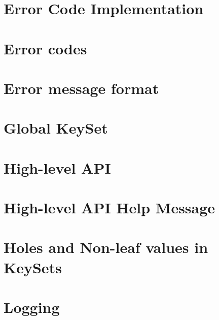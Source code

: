 \let\mypdfximage\pdfximage\def\pdfximage{\immediate\mypdfximage}\documentclass[twoside]{book}
\newcommand{\+}{\discretionary{\mbox{\scriptsize$\hookleftarrow$}}{}{}}
\begin{document}
\chapter{Error Code Implementation}
\label{doc_decisions_6_implemented_error_code_implementation_md}

\chapter{Error codes}
\label{doc_decisions_6_implemented_error_codes_md}

\chapter{Error message format}
\label{doc_decisions_6_implemented_error_message_format_md}

\chapter{Global Key\+Set}
\label{doc_decisions_6_implemented_global_keyset_md}

\chapter{High-\/level API}
\label{doc_decisions_6_implemented_high_level_api_md}

\chapter{High-\/level API Help Message}
\label{doc_decisions_6_implemented_highlevel_help_message_md}

\chapter{Holes and Non-\/leaf values in Key\+Sets}
\label{doc_decisions_6_implemented_holes_md}

\chapter{Logging}
\label{doc_decisions_6_implemented_logging_md}

\end{document}
